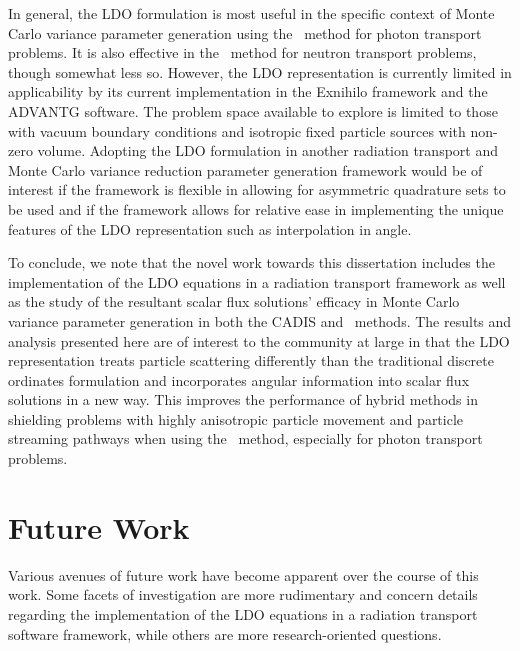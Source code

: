In general, the LDO formulation is most useful in the specific context of Monte Carlo variance
parameter generation using the \fwc\ method for photon transport problems. It is also effective in
the \fwc\ method for neutron transport problems, though somewhat less so. However, the LDO
representation is currently limited in applicability by its current implementation in the Exnihilo
framework and the ADVANTG software. The problem space available to explore is limited to those 
with vacuum boundary conditions and isotropic fixed particle sources with non-zero volume.
Adopting the LDO formulation in another radiation transport and Monte Carlo variance reduction
parameter generation framework would be of interest if the framework is flexible in allowing for
asymmetric quadrature sets to be used and if the framework allows for relative ease in 
implementing the unique features of the LDO representation such as interpolation in angle.

To conclude, we note that the novel work towards this dissertation includes the implementation of
the LDO equations in a radiation transport framework as well as the study of the resultant scalar
flux solutions' efficacy in Monte Carlo variance parameter generation in both the CADIS and \fwc\
methods. The results and analysis presented here are of interest to the community at large in that
the LDO representation treats particle scattering differently than the traditional discrete
ordinates formulation and incorporates angular information into scalar flux solutions
in a new way. This improves the performance of hybrid methods in shielding problems with highly 
anisotropic particle movement and particle streaming pathways when using the \fwc\ method, 
especially for photon transport problems.

\section{Future Work}

Various avenues of future work have become apparent over the course of this work. Some 
facets of investigation are more rudimentary and concern details regarding the implementation of
the LDO equations in a radiation transport software framework, while others are more
research-oriented questions.

